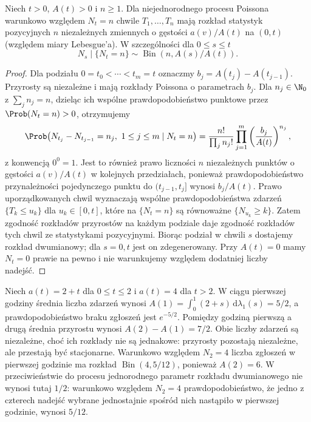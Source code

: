 \begin{wniosek}
Niech $t>0$, $A(t)>0$ i $n\ge1$. Dla niejednorodnego
procesu Poissona warunkowo względem $N_t=n$ chwile
$T_1,\ldots,T_n$ mają rozkład statystyk pozycyjnych
$n$ niezależnych zmiennych o gęstości
$a(v)/A(t)$ na $(0,t)$ (względem miary Lebesgue'a).
W szczególności dla $0\le s\le t$
\[
N_s\mid\{N_t=n\}\sim\operatorname{Bin}(n,A(s)/A(t)).
\]
\end{wniosek}
\begin{proof}
Dla podziału $0=t_0<\cdots<t_m=t$ oznaczmy
$b_j=A(t_j)-A(t_{j-1})$. Przyrosty są niezależne
i mają rozkłady Poissona o parametrach $b_j$.
Dla $n_j\in\N_0$ z $\sum_j n_j=n$, dzieląc ich wspólne
prawdopodobieństwo punktowe przez $\Prob(N_t=n)>0$,
otrzymujemy
\[
\Prob\bigl(N_{t_j}-N_{t_{j-1}}=n_j,\ 1\le j\le m
\mid N_t=n\bigr)
=\frac{n!}{\prod_j n_j!}\prod_{j=1}^m
\left(\frac{b_j}{A(t)}\right)^{n_j},
\]
z konwencją $0^0=1$. Jest to również prawo liczności
$n$ niezależnych punktów o gęstości $a(v)/A(t)$
w kolejnych przedziałach, ponieważ prawdopodobieństwo
przynależności pojedynczego punktu do $(t_{j-1},t_j]$
wynosi $b_j/A(t)$. Prawo uporządkowanych chwil
wyznaczają wspólne prawdopodobieństwa zdarzeń
$\{T_k\le u_k\}$ dla $u_k\in[0,t]$, które na
$\{N_t=n\}$ są równoważne $\{N_{u_k}\ge k\}$.
Zatem zgodność rozkładów przyrostów na każdym podziale
daje zgodność rozkładów tych chwil ze statystykami
pozycyjnymi. Biorąc podział w chwili $s$ dostajemy
rozkład dwumianowy; dla $s=0,t$ jest on zdegenerowany.
Przy $A(t)=0$ mamy $N_t=0$ prawie na pewno i nie
warunkujemy względem dodatniej liczby nadejść.
\end{proof}

\begin{przyklad}
Niech $a(t)=2+t$ dla $0\le t\le2$ i $a(t)=4$ dla $t>2$.
W ciągu pierwszej godziny średnia liczba zdarzeń wynosi
$A(1)=\int_0^1(2+s)\,\mathrm d\lambda_1(s)=5/2$,
a prawdopodobieństwo braku zgłoszeń jest $e^{-5/2}$.
Pomiędzy godziną pierwszą a drugą średnia przyrostu
wynosi $A(2)-A(1)=7/2$. Obie liczby zdarzeń są niezależne,
choć ich rozkłady nie są jednakowe: przyrosty pozostają
niezależne, ale przestają być stacjonarne.
Warunkowo względem $N_2=4$ liczba zgłoszeń w pierwszej
godzinie ma rozkład $\operatorname{Bin}(4,5/12)$,
ponieważ $A(2)=6$. W przeciwieństwie do procesu jednorodnego parametr
rozkładu dwumianowego nie wynosi tutaj $1/2$:
warunkowo względem $N_2=4$ prawdopodobieństwo,
że jedno z czterech nadejść wybrane jednostajnie
spośród nich nastąpiło w pierwszej godzinie,
wynosi $5/12$.
\end{przyklad}

